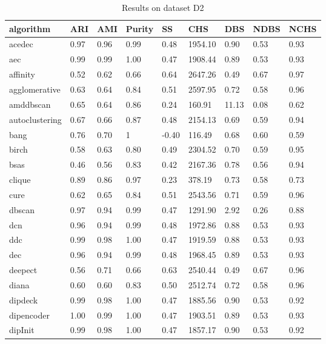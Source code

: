 \begin{table}[H]
\centering
\caption{Results on dataset D2}
\label{tab:params:D2}
\begin{tabular}{|l|l|l|l|l|l|l|l|l|}
\hline
algorithm & ARI & AMI & Purity & SS & CHS & DBS & NDBS & NCHS \\
\hline
acedec & 0.97 & 0.96 & 0.99 & 0.48 & 1954.10 & 0.90 & 0.53 & 0.93 \\
\hline
aec & 0.99 & 0.99 & 1.00 & 0.47 & 1908.44 & 0.89 & 0.53 & 0.93 \\
\hline
affinity & 0.52 & 0.62 & 0.66 & 0.64 & 2647.26 & 0.49 & 0.67 & 0.97 \\
\hline
agglomerative & 0.63 & 0.64 & 0.84 & 0.51 & 2597.95 & 0.72 & 0.58 & 0.96 \\
\hline
amddbscan & 0.65 & 0.64 & 0.86 & 0.24 & 160.91 & 11.13 & 0.08 & 0.62 \\
\hline
autoclustering & 0.67 & 0.66 & 0.87 & 0.48 & 2154.13 & 0.69 & 0.59 & 0.94 \\
\hline
bang & 0.76 & 0.70 & 1 & -0.40 & 116.49 & 0.68 & 0.60 & 0.59 \\
\hline
birch & 0.58 & 0.63 & 0.80 & 0.49 & 2304.52 & 0.70 & 0.59 & 0.95 \\
\hline
bsas & 0.46 & 0.56 & 0.83 & 0.42 & 2167.36 & 0.78 & 0.56 & 0.94 \\
\hline
clique & 0.89 & 0.86 & 0.97 & 0.23 & 378.19 & 0.73 & 0.58 & 0.73 \\
\hline
cure & 0.62 & 0.65 & 0.84 & 0.51 & 2543.56 & 0.71 & 0.59 & 0.96 \\
\hline
dbscan & 0.97 & 0.94 & 0.99 & 0.47 & 1291.90 & 2.92 & 0.26 & 0.88 \\
\hline
dcn & 0.96 & 0.94 & 0.99 & 0.48 & 1972.86 & 0.88 & 0.53 & 0.93 \\
\hline
ddc & 0.99 & 0.98 & 1.00 & 0.47 & 1919.59 & 0.88 & 0.53 & 0.93 \\
\hline
dec & 0.96 & 0.94 & 0.99 & 0.48 & 1968.45 & 0.89 & 0.53 & 0.93 \\
\hline
deepect & 0.56 & 0.71 & 0.66 & 0.63 & 2540.44 & 0.49 & 0.67 & 0.96 \\
\hline
diana & 0.60 & 0.60 & 0.83 & 0.50 & 2512.74 & 0.72 & 0.58 & 0.96 \\
\hline
dipdeck & 0.99 & 0.98 & 1.00 & 0.47 & 1885.56 & 0.90 & 0.53 & 0.92 \\
\hline
dipencoder & 1.00 & 0.99 & 1.00 & 0.47 & 1903.51 & 0.89 & 0.53 & 0.93 \\
\hline
dipInit & 0.99 & 0.98 & 1.00 & 0.47 & 1857.17 & 0.90 & 0.53 & 0.92 \\

\end{tabular}
\end{table}
